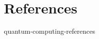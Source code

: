 \documentclass[preview]{standalone}
\begin{document}
\genpage

\nocite{*} %

\section{References}

\begin{snippet}{quantum-computing-references}
\printbibliography[heading=none]
\end{snippet}
\end{document}
